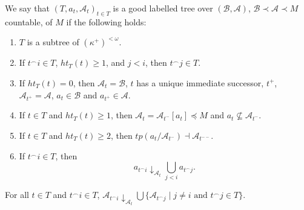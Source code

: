 \documentclass[10pt,a4paper]{amsart}
\renewcommand{\mid}{\mathrel{|}\allowbreak}
\begin{document}
\begin{defn}\label{good_labelled_tree}
    We say that $(T,a_t,\mathcal{A}_t)_{t\in T}$ is a good labelled tree over $(\mathcal{B},\mathcal{A})$, $\mathcal{B}\prec\mathcal{A}\prec M$ countable, of $M$ if the following holds:
    \begin{enumerate}
        \item $T$ is a subtree of $(\kappa^+)^{<\omega}$.
        \item If $t^\frown i\in T$, $ht_T(t)\ge 1$, and $j<i$, then $t^\frown j\in T$.
        \item If $ht_T(t)=0$, then $\mathcal{A}_{t}=\mathcal{B}$, $t$ has a unique immediate successor, $t^+$, $\mathcal{A}_{t^+}=\mathcal{A}$, $a_t\in \mathcal{B}$ and $a_{t^+}\in \mathcal{A}$.
        \item If $t\in T$ and $ht_T(t)\ge 1$, then $\mathcal{A}_t =\mathcal{A}_{t^-}[a_t]\preceq M$ and $a_t\not \subseteq\mathcal{A}_{t^-}$.
        \item If $t\in T$ and $ht_T(t)\ge 2$, then $tp(a_t / \mathcal{A}_{t^-})\dashv \mathcal{A}_{t^{--}}$.%
        \item If $t^\frown i\in T$, then $$a_{t^\frown i}\downarrow_{\mathcal{A}_t} \bigcup_{j<i}a_{t^\frown j}.$$
    \end{enumerate}
\end{defn}

\begin{fact}
    For all $t\in T$ and $t^\frown i\in T$, %
    $\mathcal{A}_{t^\frown i}\downarrow_{\mathcal{A}_t} \bigcup\{\mathcal{A}_{t^\frown j}\mid j\neq i \text{ and } t^\frown j\in T\}$.
\end{fact}
\end{document}
